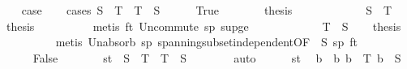 \begin{isabellebody}
\ \ \isamarkupfalse%
\ {\isacharquery}{\kern0pt}case\isanewline
\ \ \isamarkupfalse%
\ {\isacharparenleft}{\kern0pt}cases\ {\isachardoublequoteopen}S\ {\isasymsubseteq}\ T\ {\isasymor}\ T\ {\isasymsubseteq}\ S{\isachardoublequoteclose}{\isacharparenright}{\kern0pt}\isanewline
\ \ \ \ \isamarkupfalse%
\ True\isanewline
\ \ \ \ \isamarkupfalse%
\ \isamarkupfalse%
\ {\isacharquery}{\kern0pt}thesis\isanewline
\ \ \ \ \isamarkupfalse%
\isanewline
\ \ \ \ \ \ \isamarkupfalse%
\ {\isachardoublequoteopen}S\ {\isasymsubseteq}\ T{\isachardoublequoteclose}\ \isamarkupfalse%
\ \isamarkupfalse%
\ {\isacharquery}{\kern0pt}thesis\isanewline
\ \ \ \ \ \ \ \ \isamarkupfalse%
\ {\isacharparenleft}{\kern0pt}metis\ ft\ Un{\isacharunderscore}{\kern0pt}commute\ sp\ sup{\isacharunderscore}{\kern0pt}ge{}{\isacharparenright}{\kern0pt}\isanewline
\ \ \ \ \isamarkupfalse%
\isanewline
\ \ \ \ \ \ \isamarkupfalse%
\ {\isachardoublequoteopen}T\ {\isasymsubseteq}\ S{\isachardoublequoteclose}\ \isamarkupfalse%
\ \isamarkupfalse%
\ {\isacharquery}{\kern0pt}thesis\isanewline
\ \ \ \ \ \ \ \ \isamarkupfalse%
\ {\isacharparenleft}{\kern0pt}metis\ Un{\isacharunderscore}{\kern0pt}absorb\ sp\ spanning{\isacharunderscore}{\kern0pt}subset{\isacharunderscore}{\kern0pt}independent{\isacharbrackleft}{\kern0pt}OF\ {\isacharunderscore}{\kern0pt}\ S\ sp{\isacharbrackright}{\kern0pt}\ ft{\isacharparenright}{\kern0pt}\isanewline
\ \ \ \ \isamarkupfalse%
\isanewline
\ \ \isamarkupfalse%
\isanewline
\ \ \ \ \isamarkupfalse%
\ False\isanewline
\ \ \ \ \isamarkupfalse%
\ \isamarkupfalse%
\ st{\isacharcolon}{\kern0pt}\ {\isachardoublequoteopen}{\isasymnot}\ S\ {\isasymsubseteq}\ T{\isachardoublequoteclose}\ {\isachardoublequoteopen}{\isasymnot}\ T\ {\isasymsubseteq}\ S{\isachardoublequoteclose}\isanewline
\ \ \ \ \ \ \isamarkupfalse%
\ auto\isanewline
\ \ \ \ \isamarkupfalse%
\ st{\isacharparenleft}{\kern0pt}{}{\isacharparenright}{\kern0pt}\ \isamarkupfalse%
\ b\ \ b{\isacharcolon}{\kern0pt}\ {\isachardoublequoteopen}b\ {\isasymin}\ T{\isachardoublequoteclose}\ {\isachardoublequoteopen}b\ {\isasymnotin}\ S{\isachardoublequoteclose}\isanewline
\ \ \ \ \ \ \isamarkupfalse%

\end{isabellebody}
